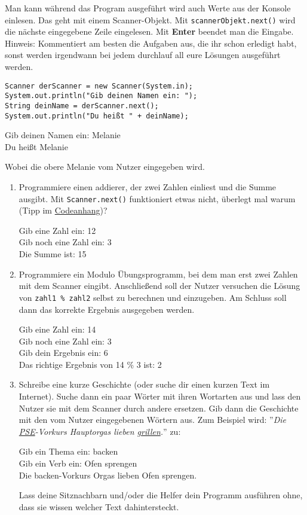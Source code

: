 \documentclass{../../sheet}
\begin{document}
\newpage
{}
Man kann während das Program ausgeführt wird auch Werte aus der Konsole einlesen. Das geht mit einem Scanner-Objekt. Mit \texttt{scannerObjekt.next()} wird die nächste eingegebene Zeile eingelesen. Mit \textbf{Enter} beendet man die Eingabe.\\
Hinweis: Kommentiert am besten die Aufgaben aus, die ihr schon erledigt habt, sonst werden irgendwann bei jedem durchlauf all eure Lösungen ausgeführt werden.
\begin{verbatim}
Scanner derScanner = new Scanner(System.in);
System.out.println("Gib deinen Namen ein: ");
String deinName = derScanner.next();
System.out.println("Du heißt " + deinName);
\end{verbatim}
\begin{ausgabe}
Gib deinen Namen ein: Melanie\\
Du heißt Melanie
\end{ausgabe}
Wobei die obere Melanie vom Nutzer eingegeben wird.

\begin{enumerate}
    \item Programmiere einen addierer, der zwei Zahlen einliest und die Summe ausgibt. Mit \texttt{Scanner.next()} funktioniert etwas nicht, überlegt mal warum (Tipp im \hyperlink{Aufgabe_2.1}{Codeanhang})?
\begin{ausgabe}
Gib eine Zahl ein: 12\\
Gib noch eine Zahl ein: 3\\
Die Summe ist: 15
\end{ausgabe}
    \item Programmiere ein Modulo Übungsprogramm, bei dem man erst zwei Zahlen mit dem Scanner eingibt. Anschließend soll der Nutzer versuchen die Lösung von \texttt{zahl1 \% zahl2} selbst zu berechnen und einzugeben. Am Schluss soll dann das korrekte Ergebnis ausgegeben werden.
\begin{ausgabe}
Gib eine Zahl ein: 14\\
Gib noch eine Zahl ein: 3\\
Gib dein Ergebnis ein: 6\\
Das richtige Ergebnis von 14 \% 3 ist: 2
\end{ausgabe}
    \item Schreibe eine kurze Geschichte (oder suche dir einen kurzen Text im Internet). Suche dann ein paar Wörter mit ihren Wortarten aus und lass den Nutzer sie mit dem Scanner durch andere ersetzen. Gib dann die Geschichte mit den vom Nutzer eingegebenen Wörtern aus. Zum Beispiel wird: ''\textit{Die \underline{PSE}-Vorkurs Hauptorgas lieben \underline{grillen}.}'' \space zu:
          \begin{ausgabe}
              Gib ein Thema ein: backen\\
              Gib ein Verb ein: Ofen sprengen\\
              Die backen-Vorkurs Orgas lieben Ofen sprengen.
          \end{ausgabe}
          Lass deine Sitznachbarn und/oder die Helfer dein Programm ausführen ohne, dass sie wissen welcher Text dahintersteckt.
\end{enumerate}
\end{document}
